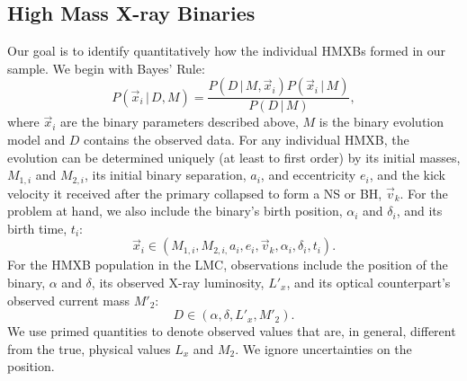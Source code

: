 \documentclass[12pt, preprint]{aastex}
\newcommand{\given}{\,|\,}
\begin{document}
\subsection{High Mass X-ray Binaries}
Our goal is to identify quantitatively how the individual HMXBs formed in our sample. We begin with Bayes' Rule:
\begin{equation}
P( \vec{x}_i \given D, M ) = \frac{P( D \given M, \vec{x}_i ) P(\vec{x}_i \given M)}{P(D \given M)},
\end{equation}
where $\vec{x}_i$ are the binary parameters described above, $M$ is the binary evolution model and $D$ contains the observed data. For any individual HMXB, the evolution can be determined uniquely (at least to first order) by its initial masses, $M_{1,i}$ and $M_{2,i}$, its initial binary separation, $a_i$, and eccentricity $e_i$, and the kick velocity it received after the primary collapsed to form a NS or BH, $\vec{v}_k$. For the problem at hand, we also include the binary's birth position, $\alpha_i$ and $\delta_i$, and its birth time, $t_i$:
\begin{equation}
\vec{x}_i \in (M_{1,i}, M_{2,i,} a_i, e_i, \vec{v}_k, \alpha_i, \delta_i, t_i). \label{eq:x_i}
\end{equation}
For the HMXB population in the LMC, observations include the position of the binary, $\alpha$ and $\delta$, its observed X-ray luminosity, $L'_x$, and its optical counterpart's observed current mass $M'_2$:
\begin{equation}
D \in (\alpha, \delta, L'_x, M'_2). \label{eq:D}
\end{equation}
We use primed quantities to denote observed values that are, in general, different from the true, physical values $L_x$ and $M_2$. We ignore uncertainties on the position.
\end{document}
